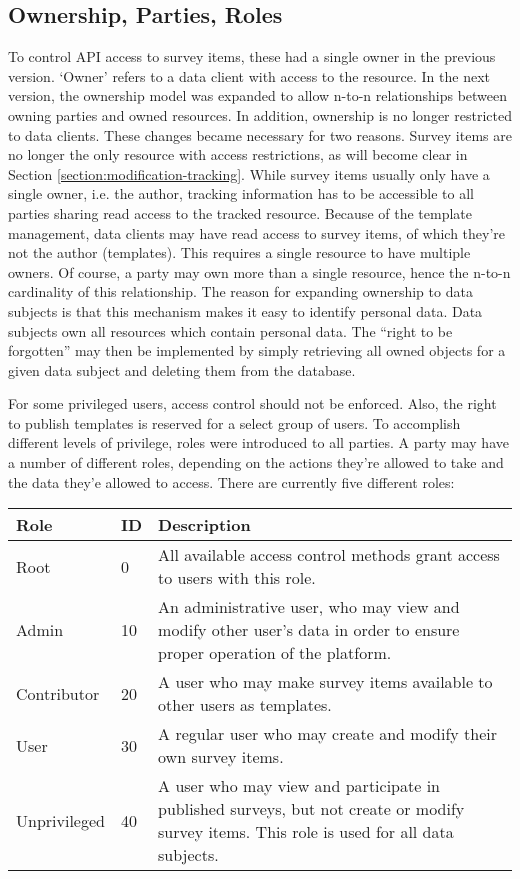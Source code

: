 \subsection{Ownership, Parties, Roles}
    To control API access to survey items, these had a single
    owner in the previous version. `Owner' refers to a data client with access
    to the resource. In the next version, the ownership model
    was expanded to allow n-to-n relationships between owning parties
    and owned resources. In addition, ownership is no longer restricted to
    data clients. These changes became necessary for two reasons.
    Survey items are no longer the only resource with access restrictions,
    as will become clear in Section \ref{section:modification-tracking}.
    While survey items usually only have a single owner, i.e. the author, 
    tracking information has to be accessible to all parties sharing
    read access to the tracked resource. Because of the template management,
    data clients may have read access to survey items, of which they're not
    the author (templates). This requires a single resource to have multiple owners.
    Of course, a party may own more than a single resource, hence the n-to-n
    cardinality of this relationship. The reason for expanding ownership
    to data subjects is that this mechanism makes it easy to identify personal
    data. Data subjects own all resources which contain
    personal data. The ``right to be forgotten'' may then be implemented by
    simply retrieving all owned objects for a given data subject and deleting 
    them from the database.

    For some privileged users, access control should not be enforced.
    Also, the right to publish templates is reserved for a select
    group of users. To accomplish different levels of privilege,
    roles were introduced to all parties. A party may have a number
    of different roles, depending on the actions they're allowed to take and
    the data they'e allowed to access. There are currently five different roles:

    \begin{table}[H]
        \begin{tabularx}{\textwidth}{|l|l|X|}
            \hline
            Role & ID & Description \\
            \hline \hline
            Root & 0 & All available access control methods grant access to users with this role. \\
            Admin & 10 & An administrative user, who may view and modify other user's data in order to ensure proper operation of the platform. \\
            Contributor & 20 & A user who may make survey items available to other users as templates. \\
            User & 30 & A regular user who may create and modify their own survey items. \\
            Unprivileged & 40 & A user who may view and participate in published surveys, but not create or modify survey items. This role is used for all data subjects.\\
            \hline
        \end{tabularx}
    \end{table}

